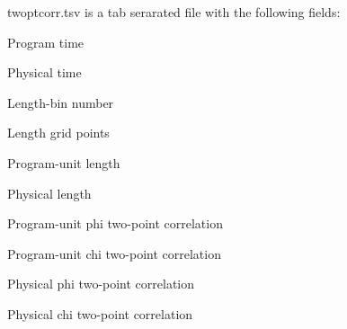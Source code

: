 twoptcorr.tsv is a tab serarated file with the following fields:

\begin{DoxyItemize}
\item Program time \item Physical time \item Length-\/bin number \item Length grid points \item Program-\/unit length \item Physical length \item Program-\/unit phi two-\/point correlation \item Program-\/unit chi two-\/point correlation \item Physical phi two-\/point correlation \item Physical chi two-\/point correlation \end{DoxyItemize}
